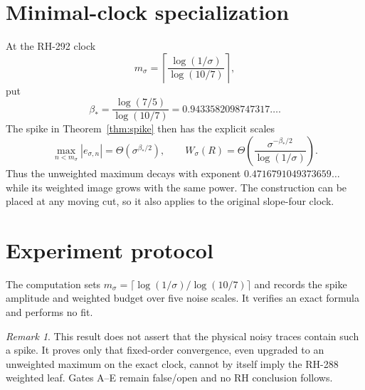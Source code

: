 \documentclass[11pt]{article}
\theoremstyle{remark}\newtheorem{remark}[theorem]{Remark}
\begin{document}
\section{Minimal-clock specialization}
At the RH-292 clock
\[
 m_\sigma=\left\lceil
 \frac{\log(1/\sigma)}{\log(10/7)}\right\rceil,
\]
put
\[
 \beta_*=\frac{\log(7/5)}{\log(10/7)}
 =0.9433582098747317\ldots.
\]
The spike in Theorem~\ref{thm:spike} then has the explicit scales
\[
 \max_{n<m_\sigma}|e_{\sigma,n}|
 =\Theta(\sigma^{\beta_*/2}),
\qquad
 W_\sigma(R)=
 \Theta\!\left(
 \frac{\sigma^{-\beta_*/2}}{\log(1/\sigma)}
 \right).
\]
Thus the unweighted maximum decays with exponent
$0.4716791049373659\ldots$ while its weighted image grows with the same
power.  The construction can be placed at any moving cut, so it also applies
to the original slope-four clock.

\section{Experiment protocol}
The computation sets
$m_\sigma=\lceil\log(1/\sigma)/\log(10/7)\rceil$ and records the spike
amplitude and weighted budget over five noise scales.  It verifies an exact
formula and performs no fit.

\begin{remark}
This result does not assert that the physical noisy traces contain such a
spike.  It proves only that fixed-order convergence, even upgraded to an
unweighted maximum on the exact clock, cannot by itself imply the RH-288
weighted leaf.  Gates A--E remain false/open and no RH conclusion follows.
\end{remark}
\end{document}
